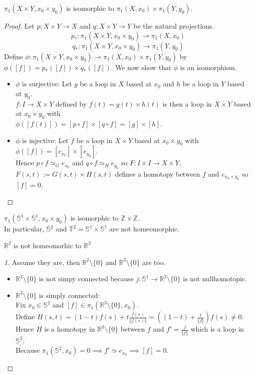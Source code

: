 \begin{theorem}\label{3.28}
    $\pi_1(X\times Y,x_0\times y_0)$ is isomorphic to $\pi_1(X,x_0)\times\pi_1(Y,y_0)$.
\end{theorem}
\begin{proof}
    Let $p:X\times Y\to X$ and $q:X\times Y\to Y$ be the natural projections.
    \[p_*:\pi_1(X\times Y,x_0\times y_0)\to\pi_1(X,x_0)\]
    \[q_*:\pi_1(X\times Y,x_0\times y_0)\to\pi_1(Y,y_0)\]
    Define $\phi:\pi_1(X\times Y,x_0\times y_0)\to\pi_1(X,x_0)\times\pi_1(Y,y_0)$ by $\phi([f])=p_*([f])\times q_*([f])$.
    We now show that $\phi$ is an isomorphism.
    \begin{itemize}
        \item $\phi$ is surjective: Let $g$ be a loop in $X$ based at $x_0$ and $h$ be a loop in $Y$ based at $y_0$.\\
        $f:I\to X\times Y$ defined by $f(t)=g(t)\times h(t)$ is then a loop in $X\times Y$ based at $x_0\times y_0$ with\\
        $\phi([f(t)])=[p\circ f]\times[q\circ f]=[g]\times [h]$.
        \item $\phi$ is injective: Let $f$ be a loop in $X\times Y$ based at $x_0\times y_0$ with $\phi([f])=[e_{x_0}]\times[e_{y_0}]$.\\
        Hence $p\circ f\simeq_Ge_{x_0}$ and $q\circ f\simeq_He_{y_0}$ so $F:I\times I\to X\times Y$, $F(s,t):=G(s,t)\times H(s,t)$ defines a homotopy between $f$ and $e_{x_0\times y_0}$ so $[f]=0$.
    \end{itemize}
\end{proof}
\begin{corollary}\label{3.29}
    $\pi_1(\mathbb{S}^1\times\mathbb{S}^1,x_0\times y_0)$ is isomorphic to $\mathbb{Z}\times\mathbb{Z}$.\\
    In particular, $\mathbb{S}^2$ and $\mathbb{T}^2=\mathbb{S}^1\times\mathbb{S}^1$ are not homeomorphic.
\end{corollary}
\begin{theorem}\label{3.30}
    $\mathbb{R}^2$ is not homeomorhic to $\mathbb{R}^3$
\end{theorem}
\begin{proof}[1]
    Assume they are, then $\mathbb{R}^2\setminus\{0\}$ and $\mathbb{R}^3\setminus\{0\}$ are too.
    \begin{itemize}
        \item $\mathbb{R}^2\setminus\{0\}$ is not simpy connected because $j:\mathbb{S}^1\to\mathbb{R}^2\setminus\{0\}$ is not nullhomotopic.
        \item $\mathbb{R}^3\setminus\{0\}$ is simply connected: \\
        Fix $x_0\in\mathbb{S}^2$ and $[f]\in\pi_1(\mathbb{R}^3\setminus\{0\},x_0)$.\\
        Define $H(s,t)=(1-t)f(s)+t\frac{f(s)}{\Vert f(s)\Vert}=((1-t)+\frac{t}{\Vert f\Vert})f(s)\neq 0$.\\
        Hence $H$ is a homotopy in $\mathbb{R}^3\setminus\{0\}$ between $f$ and $f'=\frac{f}{\Vert f\Vert}$ which is a loop in $\mathbb{S}^2$.\\
        Because $\pi_1(\mathbb{S}^2,x_0)=0\implies f'\simeq e_{x_0}\implies [f]=0$.    
    \end{itemize}
\end{proof}
